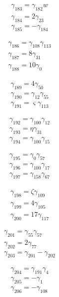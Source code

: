 \[\begin{aligned}\gamma_{183}=\gamma_{182} w\\ \gamma_{184}=2 \gamma_{23}\\ \gamma_{185}=- \gamma_{184}\end{aligned}\]

\[\begin{aligned}\gamma_{186}=\gamma_{108} \gamma_{113}\\ \gamma_{187}=8 \gamma_{31}\\ \gamma_{188}=10 \gamma_{0}\end{aligned}\]

\[\begin{aligned}\gamma_{189}=4 \gamma_{50}\\ \gamma_{190}=\gamma_{12} \gamma_{55}\\ \gamma_{191}=\varsigma  \gamma_{113}\end{aligned}\]

\[\begin{aligned}\gamma_{192}=\gamma_{100} \gamma_{12}\\ \gamma_{193}=\eta  \gamma_{31}\\ \gamma_{194}=\gamma_{100} \gamma_{15}\end{aligned}\]

\[\begin{aligned}\gamma_{195}=\gamma_{0} \gamma_{57}\\ \gamma_{196}=\gamma_{100} \gamma_{17}\\ \gamma_{197}=\gamma_{158} \gamma_{67}\end{aligned}\]

\[\begin{aligned}\gamma_{198}=\zeta  \gamma_{109}\\ \gamma_{199}=4 \gamma_{105}\\ \gamma_{200}=17 \gamma_{117}\end{aligned}\]

\[\begin{aligned}\gamma_{201}=\gamma_{55} \gamma_{57}\\ \gamma_{202}=2 \gamma_{77}\\ \gamma_{203}=\gamma_{201} - \gamma_{202}\end{aligned}\]

\[\begin{aligned}\gamma_{204}=\gamma_{191} \gamma_{4}\\ \gamma_{205}=- \gamma_{1}\\ \gamma_{206}=- \gamma_{108}\end{aligned}\]

